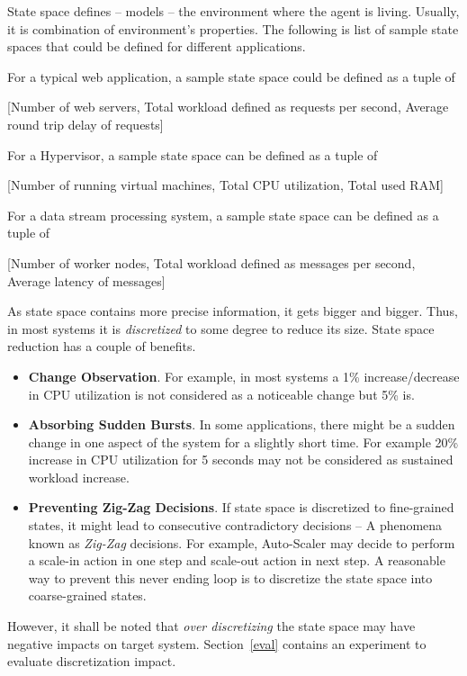 State space defines -- models -- the environment where the agent is living. Usually, it is combination of environment's properties. The following is list of sample state spaces that could be defined for different applications.
\begin{description}[leftmargin=0pt]
    \item[Web Applications] For a typical web application, a sample state space could be defined as a tuple of
    \begin{center}
        [Number of web servers, Total workload defined as requests per second, Average round trip delay of requests]
    \end{center}
    \item[Virtualization Server] For a Hypervisor, a sample state space can be defined as a tuple of
    \begin{center}
        [Number of running virtual machines, Total CPU utilization, Total used RAM]
    \end{center}
    \item[Stream Processing] For a data stream processing system, a sample state space can be defined as a tuple of
    \begin{center}
        [Number of worker nodes, Total workload defined as messages per second, Average latency of messages]
    \end{center}
\end{description}
As state space contains more precise information, it gets bigger and bigger. Thus, in most systems it is \emph{discretized} to some degree to reduce its size. State space reduction has a couple of benefits.
\begin{itemize}
    \item \textbf{Change Observation}. For example, in most systems a 1\% increase/decrease in CPU utilization is not considered as a noticeable change but 5\% is.
    \item \textbf{Absorbing Sudden Bursts}. In some applications, there might be a sudden change in one aspect of the system for a slightly short time. For example 20\% increase in CPU utilization for 5 seconds may not be considered as sustained workload increase.
    \item \textbf{Preventing Zig-Zag Decisions}. If state space is discretized to fine-grained states, it might lead to consecutive contradictory decisions -- A phenomena known as \emph{Zig-Zag} decisions. For example, Auto-Scaler may decide to perform a scale-in action in one step and scale-out action in next step. A reasonable way to prevent this never ending loop is to discretize the state space into coarse-grained states.
\end{itemize}
However, it shall be noted that \emph{over discretizing} the state space may have negative impacts on target system. Section~\ref{eval} contains an experiment to evaluate discretization impact.


